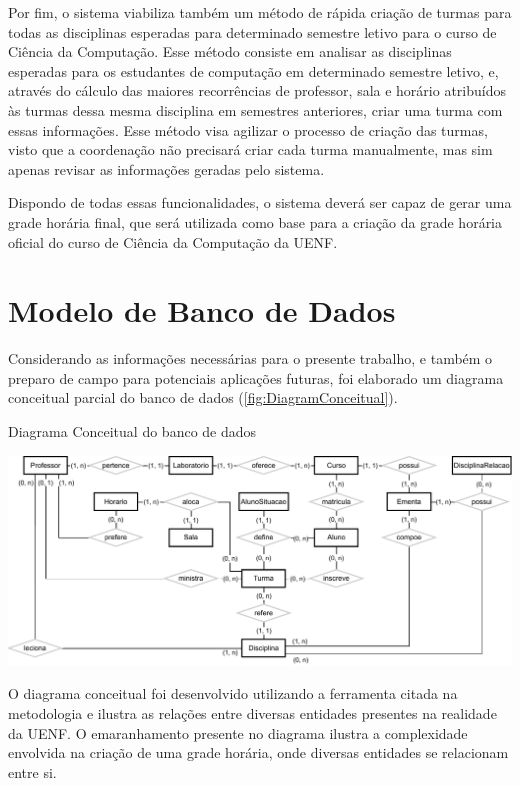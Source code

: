 Por fim, o sistema viabiliza também um método de rápida criação de turmas para todas as disciplinas esperadas para determinado semestre letivo para o curso de Ciência da Computação. Esse método consiste em analisar as disciplinas esperadas para os estudantes de computação em determinado semestre letivo, e, através do cálculo das maiores recorrências de professor, sala e horário atribuídos às turmas dessa mesma disciplina em semestres anteriores, criar uma turma com essas informações. Esse método visa agilizar o processo de criação das turmas, visto que a coordenação não precisará criar cada turma manualmente, mas sim apenas revisar as informações geradas pelo sistema.

Dispondo de todas essas funcionalidades, o sistema deverá ser capaz de gerar uma grade horária final, que será utilizada como base para a criação da grade horária oficial do curso de Ciência da Computação da UENF.

\section{Modelo de Banco de Dados} \label{sec:ModelagemBD} %

Considerando as informações necessárias para o presente trabalho, e também o preparo de campo para potenciais aplicações futuras, foi elaborado um diagrama conceitual parcial do banco de dados (\autoref{fig:DiagramConceitual}).

\begin{MyCenteredFigure}
  \caption{Diagrama Conceitual do banco de dados}
  \label{fig:DiagramConceitual}
  \includegraphics[width=\textwidth]{files/img/2.02!4-modelagem/Diagrama ER-Conc. Card.drawio}
\end{MyCenteredFigure}

O diagrama conceitual foi desenvolvido utilizando a ferramenta  citada na metodologia e ilustra as relações entre diversas entidades presentes na realidade da UENF. O emaranhamento presente no diagrama ilustra a complexidade envolvida na criação de uma grade horária, onde diversas entidades se relacionam entre si.

